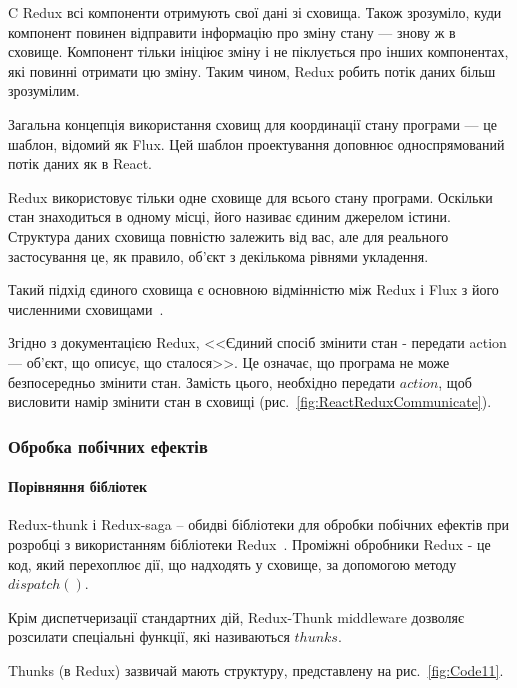 C Redux всі компоненти отримують свої дані зі сховища. Також зрозуміло, куди компонент повинен відправити інформацію про зміну стану — знову ж в сховище. Компонент тільки ініціює зміну і не піклується про інших компонентах, які повинні отримати цю зміну. Таким чином, Redux робить потік даних більш зрозумілим.

Загальна концепція використання сховищ для координації стану програми — це шаблон, відомий як Flux. Цей шаблон проектування доповнює односпрямований потік даних як в React.

Redux використовує тільки одне сховище для всього стану програми. Оскільки стан знаходиться в одному місці, його називає єдиним джерелом істини. Структура даних сховища повністю залежить від вас, але для реального застосування це, як правило, об'єкт з декількома рівнями укладення.

Такий підхід єдиного сховища є основною відмінністю між Redux і Flux з його численними сховищами~\cite{9781617294976}.

Згідно з документацією Redux, <<Єдиний спосіб змінити стан - передати action — об'єкт, що описує, що сталося>>. Це означає, що програма не може безпосередньо змінити стан. Замість цього, необхідно передати $action$, щоб висловити намір змінити стан в сховищі (рис.~\ref{fig:ReactReduxCommunicate}).

\subsubsection{Обробка побічних ефектів}

\paragraph{Порівняння бібліотек}

Redux-thunk і Redux-saga -- обидві бібліотеки для обробки побічних ефектів при розробці з використанням бібліотеки Redux~\cite{mezzalira2018mobx}. Проміжні обробники Redux - це код, який перехоплює дії, що надходять у сховище, за допомогою методу $dispatch ()$.


Крім диспетчеризації стандартних дій, Redux-Thunk middleware дозволяє розсилати спеціальні функції, які називаються $thunks$.

Thunks (в Redux) зазвичай мають структуру, представлену на рис.~\ref{fig:Code11}.


